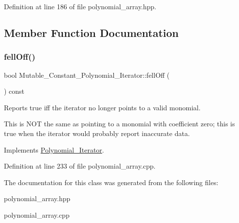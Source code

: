 Definition at line 186 of file polynomial\+\_\+array.\+hpp.



\subsection{Member Function Documentation}
\mbox{\label{class_mutable___constant___polynomial___iterator_a5b6d56b68ad61ecaaf27f8370d1c2d31}} 
\subsubsection{\texorpdfstring{fell\+Off()}{fellOff()}}
{\footnotesize\ttfamily bool Mutable\+\_\+\+Constant\+\_\+\+Polynomial\+\_\+\+Iterator\+::fell\+Off (\begin{DoxyParamCaption}{ }\end{DoxyParamCaption}) const\hspace{0.3cm}{\ttfamily [virtual]}}



Reports true iff the iterator no longer points to a valid monomial. 

This is N\+OT the same as pointing to a monomial with coefficient zero; this is true when the iterator would probably report inaccurate data. 

Implements \hyperlink{class_polynomial___iterator_ac571e120134088d6067718bbad513e2d}{Polynomial\+\_\+\+Iterator}.



Definition at line 233 of file polynomial\+\_\+array.\+cpp.



The documentation for this class was generated from the following files\+:\begin{DoxyCompactItemize}
\item 
polynomial\+\_\+array.\+hpp\item 
polynomial\+\_\+array.\+cpp\end{DoxyCompactItemize}
